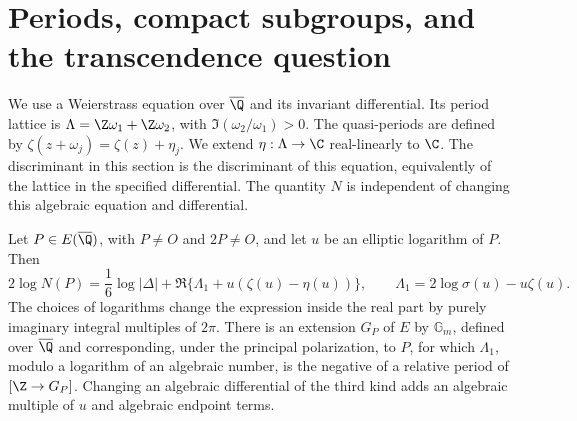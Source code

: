 \section{Periods, compact subgroups, and the transcendence question}

We use a Weierstrass equation over $\overline\Q$ and its invariant
differential. Its period lattice is $\Lambda=\Z\omega_1+\Z\omega_2$,
with $\Im(\omega_2/\omega_1)>0$. The quasi-periods are defined by
$\zeta(z+\omega_j)=\zeta(z)+\eta_j$. We extend
$\eta:\Lambda\to\C$ real-linearly to $\C$. The discriminant in
this section is the discriminant of this equation, equivalently of
the lattice in the specified differential. The quantity $N$ is
independent of changing this algebraic equation and differential.

\begin{proposition}\label{ari:C.7.1}

Let $P\in E(\overline\Q)$, with $P\ne O$ and $2P\ne O$, and
let $u$ be an elliptic logarithm of $P$. Then
\begin{equation}\label{ari:eq:cp-sigma}
 2\log N(P)=\frac16\log|\Delta|
       +\Re\{\Lambda_1+u(\zeta(u)-\eta(u))\},
 \qquad \Lambda_1=2\log\sigma(u)-u\zeta(u).
\end{equation}
The choices of logarithms change the expression inside the real
part by purely imaginary integral multiples of $2\pi$.
There is an extension $G_P$ of $E$ by $\mathbb G_m$, defined
over $\overline\Q$ and corresponding, under the principal
polarization, to $P$, for which $\Lambda_1$, modulo a logarithm
of an algebraic number, is the negative of a relative period
of $[\Z\to G_P]$. Changing an algebraic differential of the
third kind adds an algebraic multiple of $u$ and algebraic
endpoint terms.
\end{proposition}


